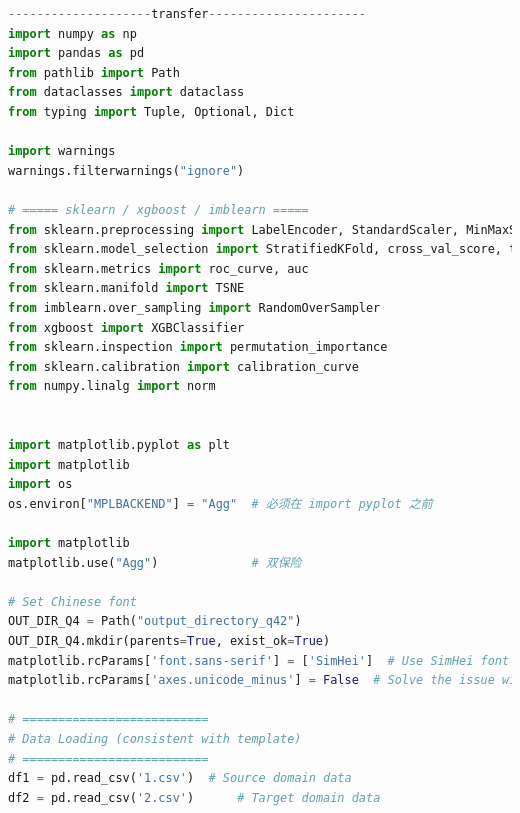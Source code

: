 \documentclass[a4paper]{CPIPC}
\numberwithin{equation}{section}
\begin{document}
\begin{lstlisting}[language=Python, caption=Transfer Learning with TCA]
--------------------transfer----------------------
import numpy as np
import pandas as pd
from pathlib import Path
from dataclasses import dataclass
from typing import Tuple, Optional, Dict

import warnings
warnings.filterwarnings("ignore")

# ===== sklearn / xgboost / imblearn =====
from sklearn.preprocessing import LabelEncoder, StandardScaler, MinMaxScaler, QuantileTransformer
from sklearn.model_selection import StratifiedKFold, cross_val_score, train_test_split
from sklearn.metrics import roc_curve, auc
from sklearn.manifold import TSNE
from imblearn.over_sampling import RandomOverSampler
from xgboost import XGBClassifier
from sklearn.inspection import permutation_importance
from sklearn.calibration import calibration_curve
from numpy.linalg import norm


import matplotlib.pyplot as plt
import matplotlib
import os
os.environ["MPLBACKEND"] = "Agg"  # 必须在 import pyplot 之前

import matplotlib
matplotlib.use("Agg")             # 双保险

# Set Chinese font
OUT_DIR_Q4 = Path("output_directory_q42")
OUT_DIR_Q4.mkdir(parents=True, exist_ok=True)
matplotlib.rcParams['font.sans-serif'] = ['SimHei']  # Use SimHei font
matplotlib.rcParams['axes.unicode_minus'] = False  # Solve the issue with negative signs

# ==========================
# Data Loading (consistent with template)
# ==========================
df1 = pd.read_csv('1.csv')  # Source domain data
df2 = pd.read_csv('2.csv')      # Target domain data


\end{lstlisting}
\end{document}
